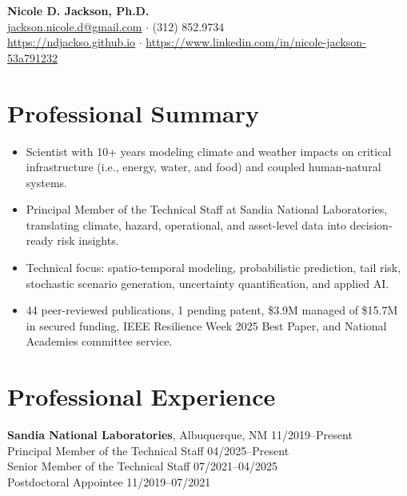 \documentclass{article}[12pt]
\begin{document}
	
	\thispagestyle{firstPage}
	
	\begin{center}
		\textbf{\Large{Nicole D. Jackson, Ph.D.}}\\
		\href{mailto:jackson.nicole.d@gmail.com}{jackson.nicole.d@gmail.com} $\cdot$ (312) 852.9734 \\
		\href{https://ndjackso.github.io}{https://ndjackso.github.io} $\cdot$ \href{https://www.linkedin.com/in/nicole-jackson-53a791232}{https://www.linkedin.com/in/nicole-jackson-53a791232}
	\end{center}
	
	\vspace{-1em}
	\section*{Professional Summary}
	\vspace{-0.75em}
	\begin{itemize}[leftmargin=*]
		\itemsep0em
		\item Scientist with 10+ years modeling climate and weather impacts on critical infrastructure (i.e., energy, water, and food) and coupled human-natural systems.
		\item Principal Member of the Technical Staff at Sandia National Laboratories, translating climate, hazard, operational, and asset-level data into decision-ready risk insights.
		\item Technical focus: spatio-temporal modeling, probabilistic prediction, tail risk, stochastic scenario generation, uncertainty quantification, and applied AI.
		\item 44 peer-reviewed publications, 1 pending patent, \$3.9M managed of \$15.7M in secured funding, IEEE Resilience Week 2025 Best Paper, and National Academies committee service.
	\end{itemize}
	
	\vspace{-0.75em}
	\section*{Professional Experience}
	\vspace{-0.5em}
	
	\textbf{Sandia National Laboratories}, Albuquerque, NM \hfill{} 11/2019--Present \\
	Principal Member of the Technical Staff \hfill{} 04/2025--Present \\
	Senior Member of the Technical Staff \hfill{} 07/2021--04/2025 \\
	Postdoctoral Appointee \hfill{} 11/2019--07/2021\\ [0.25em]
	
\end{document}
